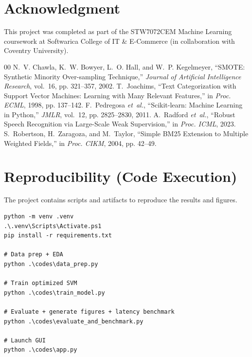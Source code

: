 \documentclass[conference]{IEEEtran}
\begin{document}
\section*{Acknowledgment}
This project was completed as part of the STW7072CEM Machine Learning coursework at Softwarica College of IT \& E-Commerce (in collaboration with Coventry University).

\begin{thebibliography}{00}
 N.~V. Chawla, K.~W. Bowyer, L.~O. Hall, and W.~P. Kegelmeyer, ``SMOTE: Synthetic Minority Over-sampling Technique,'' \emph{Journal of Artificial Intelligence Research}, vol.~16, pp. 321--357, 2002.
 T.~Joachims, ``Text Categorization with Support Vector Machines: Learning with Many Relevant Features,'' in \emph{Proc. ECML}, 1998, pp. 137--142.
 F.~Pedregosa \emph{et~al.}, ``Scikit-learn: Machine Learning in Python,'' \emph{JMLR}, vol.~12, pp. 2825--2830, 2011.
 A.~Radford \emph{et~al.}, ``Robust Speech Recognition via Large-Scale Weak Supervision,'' in \emph{Proc. ICML}, 2023.
 S.~Robertson, H.~Zaragoza, and M.~Taylor, ``Simple BM25 Extension to Multiple Weighted Fields,'' in \emph{Proc. CIKM}, 2004, pp. 42--49.
\end{thebibliography}

\appendices
\section{Reproducibility (Code Execution)}
The project contains scripts and artifacts to reproduce the results and figures.
\begin{verbatim}
python -m venv .venv
.\.venv\Scripts\Activate.ps1
pip install -r requirements.txt

# Data prep + EDA
python .\codes\data_prep.py

# Train optimized SVM
python .\codes\train_model.py

# Evaluate + generate figures + latency benchmark
python .\codes\evaluate_and_benchmark.py

# Launch GUI
python .\codes\app.py
\end{verbatim}
\end{document}
